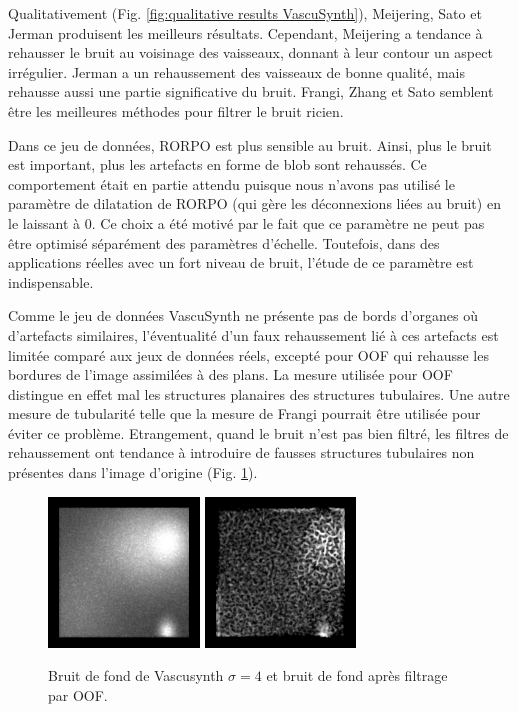 Qualitativement (Fig. \ref{fig:qualitative results VascuSynth}), Meijering, Sato et Jerman produisent les meilleurs résultats. Cependant, Meijering a tendance à rehausser le bruit au voisinage des vaisseaux, donnant à leur contour un aspect irrégulier. Jerman a un rehaussement des vaisseaux de bonne qualité, mais rehausse aussi une partie significative du bruit. Frangi, Zhang et Sato semblent être les meilleures méthodes pour filtrer le bruit ricien. 


Dans ce jeu de données, RORPO est plus sensible au bruit. Ainsi, plus le bruit est important, plus les artefacts en forme de blob sont rehaussés. 
Ce comportement était en partie attendu puisque nous n'avons pas utilisé le paramètre de dilatation de RORPO (qui gère les déconnexions liées au bruit) en le laissant à 0. Ce choix a été motivé par le fait que ce paramètre ne peut pas être optimisé séparément des paramètres d'échelle. Toutefois, dans des applications réelles avec un fort niveau de bruit, l'étude de ce paramètre est indispensable. 

Comme le jeu de données VascuSynth ne présente pas de bords d'organes où d'artefacts similaires, l'éventualité d'un faux rehaussement lié à ces artefacts est limitée comparé aux jeux de données réels, excepté pour OOF qui rehausse les bordures de l'image assimilées à des plans. La mesure utilisée pour OOF distingue en effet mal les structures planaires des structures tubulaires. Une autre mesure de tubularité telle que la mesure de Frangi pourrait être utilisée pour éviter ce problème. Etrangement, quand le bruit n'est pas bien filtré, les filtres de rehaussement ont tendance à introduire de fausses structures tubulaires non présentes dans l'image d'origine (Fig. \ref{fig:noisy_tubes}).

\begin{figure}[!ht]
  \centering
  \includegraphics[height=4cm]{Images/vascu_noise.png}
  \includegraphics[height=4cm]{Images/vascu_noise_OOF.png}
  \caption{Bruit de fond de Vascusynth $\sigma=4$ et bruit de fond après filtrage par OOF.}
  \label{fig:noisy_tubes}
\end{figure}

